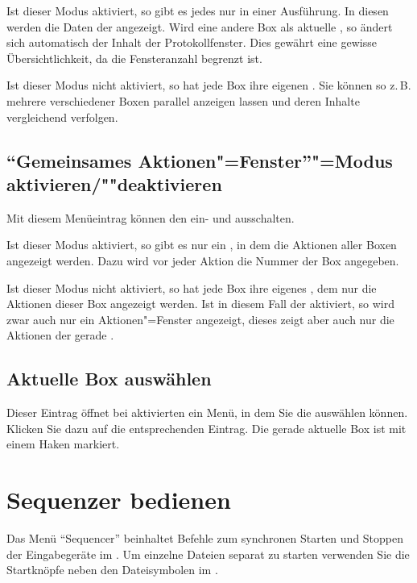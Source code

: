 Ist dieser Modus aktiviert, so gibt es jedes
 nur in einer
Ausführung. In diesen werden die Daten der
 angezeigt. Wird eine
andere Box als aktuelle , so
ändert sich automatisch der Inhalt der Protokollfenster. Dies gewährt
eine gewisse Übersichtlichkeit, da die Fensteranzahl begrenzt ist.


Ist dieser Modus nicht aktiviert, so hat jede Box ihre eigenen
. Sie können so z.\,B.
mehrere  verschiedener
Boxen parallel anzeigen lassen und deren Inhalte vergleichend
verfolgen.


\subsection{"`Gemeinsames Aktionen"=Fenster"'"=Modus
  aktivieren/""deaktivieren}
\label{sec:MI_CAW}
Mit diesem Menüeintrag können den  ein- und ausschalten.


Ist dieser Modus aktiviert, so gibt es nur ein
, in dem die Aktionen aller
Boxen angezeigt werden. Dazu wird vor jeder Aktion die Nummer der Box
angegeben.


Ist dieser Modus nicht aktiviert, so hat jede Box ihre eigenes
, dem nur die Aktionen
dieser Box angezeigt werden. Ist in diesem Fall der
aktiviert, so wird zwar
auch nur ein Aktionen"=Fenster angezeigt, dieses zeigt aber auch nur
die Aktionen der gerade .



\subsection{Aktuelle Box auswählen}
\label{sec:MI_SELECTBOX}

Dieser Eintrag öffnet bei aktivierten
 ein Menü, in dem Sie die
 auswählen können. Klicken
Sie dazu auf die entsprechenden Eintrag. Die gerade aktuelle Box ist
mit einem Haken markiert.


\section{Sequenzer bedienen}\label{sec:MS_SEQUENCER}
Das Menü "`Sequencer"' beinhaltet Befehle zum synchronen Starten 
und Stoppen der Eingabegeräte im . 
Um einzelne Dateien separat zu starten verwenden Sie die Startknöpfe 
neben den Dateisymbolen im  .

